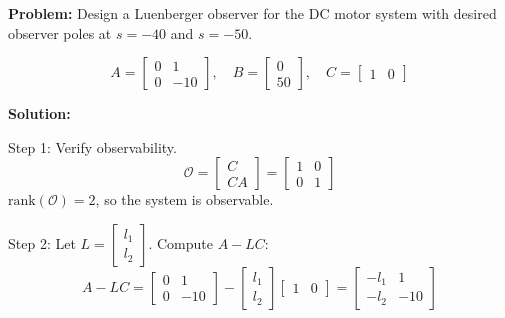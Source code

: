 \hrulefill

\begin{examplebox}

\textbf{Problem:} Design a Luenberger observer for the DC motor system with desired observer poles at $s = -40$ and $s = -50$.

\begin{equation}
A = \begin{bmatrix} 0 & 1 \\ 0 & -10 \end{bmatrix}, \quad
B = \begin{bmatrix} 0 \\ 50 \end{bmatrix}, \quad
C = \begin{bmatrix} 1 & 0 \end{bmatrix}
\end{equation}

\textbf{Solution:}

Step 1: Verify observability.
\begin{equation}
\mathcal{O} = \begin{bmatrix} C \\ CA \end{bmatrix} = \begin{bmatrix} 1 & 0 \\ 0 & 1 \end{bmatrix}
\end{equation}
$\text{rank}(\mathcal{O}) = 2$, so the system is observable.

Step 2: Let $L = \begin{bmatrix} l_1 \\ l_2 \end{bmatrix}$. Compute $A - LC$:
\begin{equation}
A - LC = \begin{bmatrix} 0 & 1 \\ 0 & -10 \end{bmatrix} - \begin{bmatrix} l_1 \\ l_2 \end{bmatrix} \begin{bmatrix} 1 & 0 \end{bmatrix}
= \begin{bmatrix} -l_1 & 1 \\ -l_2 & -10 \end{bmatrix}
\end{equation}


\end{examplebox}
